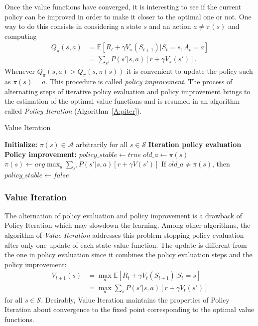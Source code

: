 Once the value functions have converged, it is interesting to see if the current policy can be improved in order to make it closer to the optimal one or not. One way to do this consists in considering a state $s$ and an action $a \neq \pi(s)$ and computing
\begin{align}
 Q_\pi(s,a) &= \mathbb{E}[R_t + \gamma V_\pi(S_{t+1}) | S_t = s, A_t = a]\nonumber\\
            &= \sum_{s'} P(s' | s,a)[r + \gamma V_\pi(s')].
\end{align}
Whenever $Q_\pi(s,a) > Q_\pi(s, \pi(s))$ it is convenient to update the policy such as $\pi(s) = a$. This procedure is called \textit{policy improvement}.
The process of alternating steps of iterative policy evaluation and policy improvement brings to the estimation of the optimal value functions and is resumed in an algorithm called \textit{Policy Iteration} (Algorithm~\ref{A:piter}).
\begin{algorithm}[t]
 \caption{Value Iteration}
 \begin{algorithmic}[1]\label{A:piter}
  \STATE \textbf{Initialize:} $\pi(s) \in \mathcal{A}$ arbitrarily for all $s \in \mathcal{S}$
  \REPEAT
  \STATE \textbf{Iteration policy evaluation}
  \STATE \textbf{Policy improvement:}
  \STATE $policy\_stable \leftarrow true$
  \STATE $old\_a \leftarrow \pi(s)$
  \STATE $\pi(s) \leftarrow arg\max_a \sum_{s'} P(s'|s,a)[r + \gamma V(s')]$
  \STATE If $old\_a \neq \pi(s)$, then $policy\_stable \leftarrow false$
  \ENDFOR
 \end{algorithmic}
\end{algorithm}

\subsubsection{Value Iteration}
The alternation of policy evaluation and policy improvement is a drawback of Policy Iteration which may slowdown the learning. Among other algorithms, the algorithm of \textit{Value Iteration} addresses this problem stopping policy evaluation after only one update of each state value function. The update is different from the one in policy evaluation since it combines the policy evaluation steps and the policy improvement:
\begin{align}
 V_{t+1} (s) &= \max_a \mathbb{E}[R_t + \gamma V_t(S_{t+1}) | S_t = s]\nonumber\\
             &= \max_a \sum_s P(s' | s, a)[r + \gamma V_t(s')]
\end{align}
for all $s \in \mathcal{S}$. Desirably, Value Iteration maintains the properties of Policy Iteration about convergence to the fixed point corresponding to the optimal value functions.

